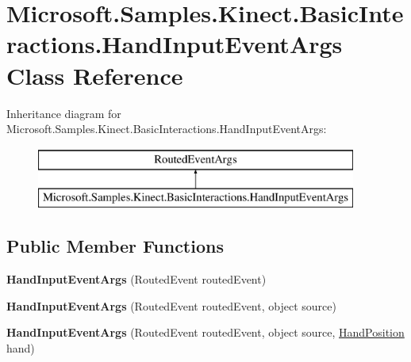 \hypertarget{class_microsoft_1_1_samples_1_1_kinect_1_1_basic_interactions_1_1_hand_input_event_args}{\section{Microsoft.\-Samples.\-Kinect.\-Basic\-Interactions.\-Hand\-Input\-Event\-Args Class Reference}
\label{class_microsoft_1_1_samples_1_1_kinect_1_1_basic_interactions_1_1_hand_input_event_args}
}
Inheritance diagram for Microsoft.\-Samples.\-Kinect.\-Basic\-Interactions.\-Hand\-Input\-Event\-Args\-:\begin{figure}[H]
\begin{center}
\leavevmode
\includegraphics[height=2.000000cm]{class_microsoft_1_1_samples_1_1_kinect_1_1_basic_interactions_1_1_hand_input_event_args}
\end{center}
\end{figure}
\subsection*{Public Member Functions}
\begin{DoxyCompactItemize}
\item 
\hypertarget{class_microsoft_1_1_samples_1_1_kinect_1_1_basic_interactions_1_1_hand_input_event_args_af02547a95529c5b72a2e9eb505146301}{{\bfseries Hand\-Input\-Event\-Args} (Routed\-Event routed\-Event)}\label{class_microsoft_1_1_samples_1_1_kinect_1_1_basic_interactions_1_1_hand_input_event_args_af02547a95529c5b72a2e9eb505146301}

\item 
\hypertarget{class_microsoft_1_1_samples_1_1_kinect_1_1_basic_interactions_1_1_hand_input_event_args_a22c66e5aad8dec38643a409ab8e73d4d}{{\bfseries Hand\-Input\-Event\-Args} (Routed\-Event routed\-Event, object source)}\label{class_microsoft_1_1_samples_1_1_kinect_1_1_basic_interactions_1_1_hand_input_event_args_a22c66e5aad8dec38643a409ab8e73d4d}

\item 
\hypertarget{class_microsoft_1_1_samples_1_1_kinect_1_1_basic_interactions_1_1_hand_input_event_args_a16351c093aaaca11f3f41c0636e812bd}{{\bfseries Hand\-Input\-Event\-Args} (Routed\-Event routed\-Event, object source, \hyperlink{class_microsoft_1_1_samples_1_1_kinect_1_1_basic_interactions_1_1_hand_position}{Hand\-Position} hand)}\label{class_microsoft_1_1_samples_1_1_kinect_1_1_basic_interactions_1_1_hand_input_event_args_a16351c093aaaca11f3f41c0636e812bd}

\end{DoxyCompactItemize}
